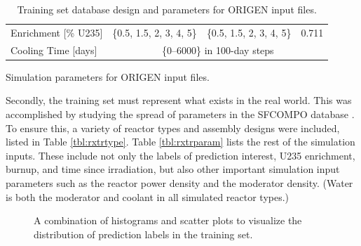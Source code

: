 \begin{table}[!htb]
\begin{subtable}{\linewidth}
\begin{tabular}{@{}llll@{}}
      Enrichment [\% \gls{U235}]& \{0.5, 1.5, 2, 3, 4, 5\}  & \{0.5, 1.5, 2, 3, 4, 5\}  & 0.711         \\
      Cooling Time [days]       & \multicolumn{3}{c}{\{0--6000\} in 100-day steps}                      \\ \bottomrule
    \end{tabular}
    \caption{Simulation parameters for \acrshort{ORIGEN} input files.}
    \label{tbl:rxtrparam}
  \end{subtable}%
  \caption[Training set database design for \acrshort{ORIGEN} input files.]
          {Training set database design and parameters for \acrshort{ORIGEN} 
           input files.}
  \label{tbl:train}
\end{table}

Secondly, the training set must represent what exists in the real world. This
was accomplished by studying the spread of parameters in the \gls{SFCOMPO}
database \cite{sfcompo, valid_sfco}.  To ensure this, a variety of reactor
types and assembly designs were included, listed in Table \ref{tbl:rxtrtype}.
Table \ref{tbl:rxtrparam} lists the rest of the simulation inputs. These
include not only the labels of prediction interest, \gls{U235} enrichment,
burnup, and time since irradiation, but also other important simulation input
parameters such as the reactor power density and the moderator density.  (Water
is both the moderator and coolant in all simulated reactor types.)

\begin{figure}[!hbt]
  \caption[Visualization of training set labels distributions]
          {A combination of histograms and scatter plots to visualize the 
           distribution of prediction labels in the training set.}
  \label{fig:trainhist}
\end{figure}

